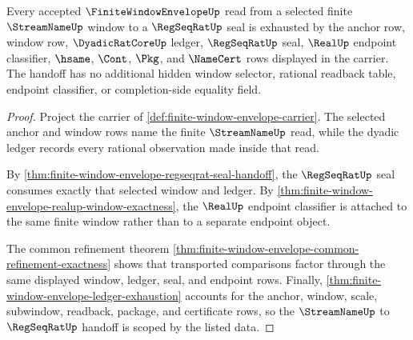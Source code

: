 \begin{theorem}
\label{thm:finite-window-envelope-streamname-regseqrat-scope}
Every accepted $\FiniteWindowEnvelopeUp$ read from a selected finite $\StreamNameUp$ window to a $\RegSeqRatUp$ seal is exhausted by the anchor row, window row, $\DyadicRatCoreUp$ ledger, $\RegSeqRatUp$ seal, $\RealUp$ endpoint classifier, $\hsame$, $\Cont$, $\Pkg$, and $\NameCert$ rows displayed in the carrier. The handoff has no additional hidden window selector, rational readback table, endpoint classifier, or completion-side equality field.
\end{theorem}
\begin{proof}
Project the carrier of \autoref{def:finite-window-envelope-carrier}. The selected anchor and window rows name the finite $\StreamNameUp$ read, while the dyadic ledger records every rational observation made inside that read.

By \autoref{thm:finite-window-envelope-regseqrat-seal-handoff}, the $\RegSeqRatUp$ seal consumes exactly that selected window and ledger. By \autoref{thm:finite-window-envelope-realup-window-exactness}, the $\RealUp$ endpoint classifier is attached to the same finite window rather than to a separate endpoint object.

The common refinement theorem \autoref{thm:finite-window-envelope-common-refinement-exactness} shows that transported comparisons factor through the same displayed window, ledger, seal, and endpoint rows. Finally, \autoref{thm:finite-window-envelope-ledger-exhaustion} accounts for the anchor, window, scale, subwindow, readback, package, and certificate rows, so the $\StreamNameUp$ to $\RegSeqRatUp$ handoff is scoped by the listed data.
\end{proof}

